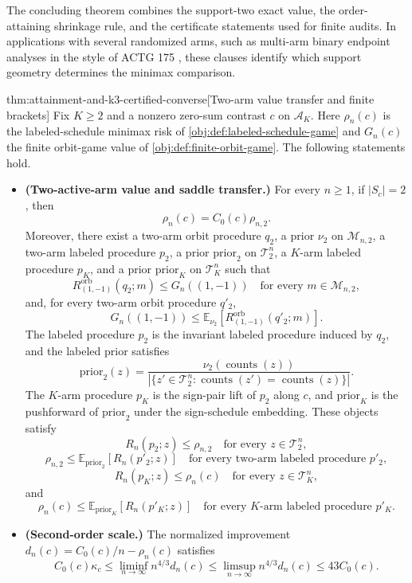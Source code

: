 The concluding theorem combines the support-two exact value, the order-attaining shrinkage rule, and the certificate statements used for finite audits. In applications with several randomized arms, such as multi-arm binary endpoint analyses in the style of ACTG 175 \citep{hammer_et_al_1996_actg175}, these clauses identify which support geometry determines the minimax comparison.

\begin{theoremv}{thm:attainment-and-k3-certified-converse}[Two-arm value transfer and finite brackets]
Fix \(K\ge 2\) and a nonzero zero-sum contrast \(c\) on \(\mathcal A_K\). Here \(\rho_n(c)\) is the labeled-schedule minimax risk of \cref{obj:def:labeled-schedule-game} and \(G_n(c)\) the finite orbit-game value of \cref{obj:def:finite-orbit-game}.
The following statements hold.
\begin{itemize}
\item \textbf{(Two-active-arm value and saddle transfer.)} For every \(n\ge 1\), if \(|S_c|=2\), then
\[
\rho_n(c)=C_0(c)\rho_{n,2}.
\]
Moreover, there exist a two-arm orbit procedure \(q_2\), a prior \(\nu_2\) on \(\mathcal M_{n,2}\), a two-arm labeled procedure \(p_2\), a prior \(\mathrm{prior}_2\) on \(\mathcal T_2^n\), a \(K\)-arm labeled procedure \(p_K\), and a prior \(\mathrm{prior}_K\) on \(\mathcal T_K^n\) such that
\[
R^{\mathrm{orb}}_{(1,-1)}(q_2;m)\le G_n((1,-1))
\quad\text{for every }m\in\mathcal M_{n,2},
\]
and, for every two-arm orbit procedure \(q'_2\),
\[
G_n((1,-1))
\le
\mathbb E_{\nu_2}\!\left[R^{\mathrm{orb}}_{(1,-1)}(q'_2;m)\right].
\]
The labeled procedure \(p_2\) is the invariant labeled procedure induced by \(q_2\), and the labeled prior satisfies
\[
\mathrm{prior}_2(z)=
\frac{\nu_2(\operatorname{counts}(z))}
     {|\{z'\in\mathcal T_2^n:\operatorname{counts}(z')=\operatorname{counts}(z)\}|}.
\]
The \(K\)-arm procedure \(p_K\) is the sign-pair lift of \(p_2\) along \(c\), and \(\mathrm{prior}_K\) is the pushforward of \(\mathrm{prior}_2\) under the sign-schedule embedding. These objects satisfy
\[
R_n(p_2;z)\le \rho_{n,2}
\quad\text{for every }z\in\mathcal T_2^n,
\]
\[
\rho_{n,2}\le
\mathbb E_{\mathrm{prior}_2}\!\left[R_n(p'_2;z)\right]
\quad\text{for every two-arm labeled procedure }p'_2,
\]
\[
R_n(p_K;z)\le \rho_n(c)
\quad\text{for every }z\in\mathcal T_K^n,
\]
and
\[
\rho_n(c)\le
\mathbb E_{\mathrm{prior}_K}\!\left[R_n(p'_K;z)\right]
\quad\text{for every \(K\)-arm labeled procedure }p'_K.
\]

\item \textbf{(Second-order scale.)} The normalized improvement \(d_n(c)=C_0(c)/n-\rho_n(c)\) satisfies
\[
C_0(c)\kappa_c
\le
\liminf_{n\to\infty} n^{4/3}d_n(c)
\le
\limsup_{n\to\infty} n^{4/3}d_n(c)
\le
43C_0(c).
\]


\end{itemize}
\end{theoremv}
